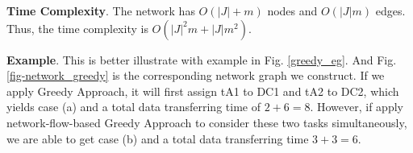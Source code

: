 \textbf{Time Complexity}. The network has $O(|J|+m)$ nodes and $O(\left | J \right | m)$ edges. Thus, the time complexity is $O(|J|^2m+|J|m^2) $.


\textbf{Example}. This is better illustrate with example in Fig. \ref{greedy_eg}. And Fig. \ref{fig-network_greedy} is the corresponding network graph we construct. If we apply Greedy Approach, it will first assign tA1 to DC1 and tA2 to DC2, which yields case (a) and a total data transferring time of $2+6=8$. However, if apply network-flow-based Greedy Approach to consider these two tasks simultaneously, we are able to get case (b) and a total data transferring time $3+3=6$.

